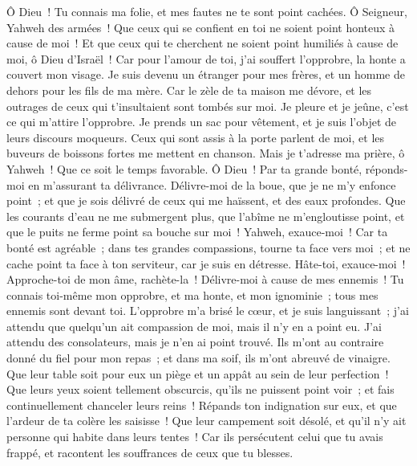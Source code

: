 \begin{multicols}{2}
Ô Dieu~! Tu connais ma folie, et mes fautes ne te sont point cachées.
Ô Seigneur, Yahweh des armées~! Que ceux qui se confient en toi ne soient point honteux à cause de moi~! Et que ceux qui te cherchent ne soient point humiliés à cause de moi, ô Dieu d'Israël~!
Car pour l'amour de toi, j'ai souffert l'opprobre, la honte a couvert mon visage.
Je suis devenu un étranger pour mes frères, et un homme de dehors pour les fils de ma mère.
Car le zèle de ta maison me dévore, et les outrages de ceux qui t'insultaient sont tombés sur moi.
Je pleure et je jeûne, c'est ce qui m'attire l'opprobre.
Je prends un sac pour vêtement, et je suis l'objet de leurs discours moqueurs.
Ceux qui sont assis à la porte parlent de moi, et les buveurs de boissons fortes me mettent en chanson.
Mais je t'adresse ma prière, ô Yahweh~! Que ce soit le temps favorable. Ô Dieu~! Par ta grande bonté, réponds-moi en m'assurant ta délivrance.
Délivre-moi de la boue, que je ne m'y enfonce point~; et que je sois délivré de ceux qui me haïssent, et des eaux profondes.
Que les courants d'eau ne me submergent plus, que l'abîme ne m'engloutisse point, et que le puits ne ferme point sa bouche sur moi~!
Yahweh, exauce-moi~! Car ta bonté est agréable~; dans tes grandes compassions, tourne ta face vers moi~;
et ne cache point ta face à ton serviteur, car je suis en détresse. Hâte-toi, exauce-moi~!
Approche-toi de mon âme, rachète-la~! Délivre-moi à cause de mes ennemis~!
Tu connais toi-même mon opprobre, et ma honte, et mon ignominie~; tous mes ennemis sont devant toi.
L'opprobre m'a brisé le cœur, et je suis languissant~; j'ai attendu que quelqu'un ait compassion de moi, mais il n'y en a point eu. J'ai attendu des consolateurs, mais je n'en ai point trouvé.
Ils m'ont au contraire donné du fiel pour mon repas~; et dans ma soif, ils m'ont abreuvé de vinaigre.
Que leur table soit pour eux un piège et un appât au sein de leur perfection~!
Que leurs yeux soient tellement obscurcis, qu'ils ne puissent point voir~; et fais continuellement chanceler leurs reins~!
Répands ton indignation sur eux, et que l'ardeur de ta colère les saisisse~!
Que leur campement soit désolé, et qu'il n'y ait personne qui habite dans leurs tentes~!
Car ils persécutent celui que tu avais frappé, et racontent les souffrances de ceux que tu blesses.

\end{multicols}
